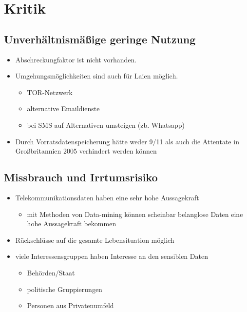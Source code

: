 \section{Kritik}
  \subsection{Unverhältnismäßige geringe Nutzung}
    \begin{frame}
      \begin{itemize}
        \item
          Abschreckungfaktor ist nicht vorhanden.
         \item
         Umgehungsmöglichkeiten sind auch für Laien möglich.
           \begin{itemize}
         \item TOR-Netzwerk
         \item alternative Emaildienste
         \item bei SMS auf Alternativen umsteigen (zb. Whatsapp)
      \end{itemize}
        \item
       	Durch Vorratsdatenspeicherung hätte weder 9/11 als auch die Attentate in Großbritannien 2005 verhindert werden können


      \end{itemize}
    \end{frame}


  \subsection{Missbrauch und Irrtumsrisiko}
    \begin{frame}
      \begin{itemize}
        \item
          Telekommunikationsdaten haben eine sehr hohe Aussagekraft
                 \begin{itemize}
         \item mit Methoden von Data-mining können scheinbar belanglose Daten eine hohe Aussagekraft bekommen
      \end{itemize}
        \item
          Rückschlüsse auf die gesamte Lebensituation möglich
 \item viele Interessensgruppen haben Interesse an den sensiblen Daten
          \begin{itemize}
         \item Behörden/Staat
         \item politische Gruppierungen
         \item Personen aus Privatenumfeld
      \end{itemize}
 
      \end{itemize}
    \end{frame}

